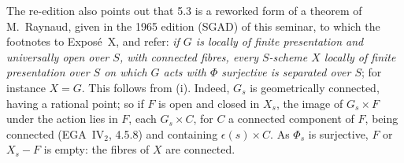 The re-edition also points out that 5.3 is a reworked form of a theorem of M.~Raynaud, given in the 1965 edition
(SGAD) of this seminar, to which the footnotes to Expos\'e~X,  and
 refer: \emph{if \(G\) is locally of finite
presentation and universally open over \(S\), with connected fibres, every \(S\)-scheme \(X\) locally of finite
presentation over \(S\) on which \(G\) acts with \(\Phi\) surjective is separated over \(S\)}; for instance
\(X=G\). This follows from (i). Indeed, \(G_s\) is geometrically connected, having a rational point; so if \(F\)
is open and closed in \(X_s\), the image of \(G_s\times F\) under the action lies in \(F\), each
\(G_s\times C\), for \(C\) a connected component of \(F\), being connected (EGA~IV\(_2\), 4.5.8) and containing
\(\epsilon(s)\times C\). As \(\Phi_s\) is surjective, \(F\) or \(X_s-F\) is empty: the fibres of \(X\) are
connected.
\par\medskip

